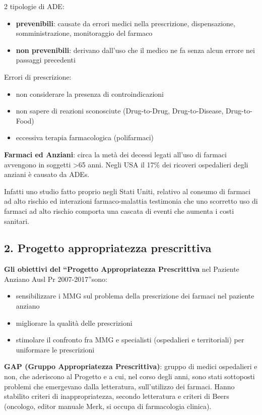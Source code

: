   2 tipologie di ADE:

\begin{itemize}
\item
  \textbf{prevenibili}: causate da errori medici nella prescrizione,
  dispensazione, somministrazione, monitoraggio del farmaco
\item
  \textbf{non prevenibili}: derivano dall'uso che il medico ne fa senza
  alcun errore nei passaggi precedenti
\end{itemize}

  Errori di prescrizione:
  
\begin{itemize}
\item non considerare la presenza di controindicazioni
\item non sapere di reazioni sconosciute (Drug-to-Drug, Drug-to-Disease,
  Drug-to-Food)
\item eccessiva terapia farmacologica (polifarmaci)
\end{itemize}

  \textbf{Farmaci ed Anziani}: circa la metà dei decessi legati all'uso
  di farmaci avvengono in soggetti \textgreater{}65 anni. Negli USA il
  17\% dei ricoveri ospedalieri degli anziani è causato da ADEs.

  Infatti uno studio fatto proprio negli Stati Uniti, relativo al
  consumo di farmaci ad alto rischio ed interazioni farmaco-malattia
  testimonia che uno scorretto uso di farmaci ad alto rischio comporta
  una cascata di eventi che aumenta i costi sanitari.

  \subsection{2. Progetto appropriatezza prescrittiva}
  
  \textbf{Gli obiettivi del ``Progetto Appropriatezza Prescrittiva} nel
  Paziente Anziano Ausl Pr 2007-2017''sono:

\begin{itemize}
\item
  sensibilizzare i MMG sul problema della prescrizione dei farmaci nel
  paziente anziano
\item
  migliorare la qualità delle prescrizioni
\item
  stimolare il confronto fra MMG e specialisti (ospedalieri e
  territoriali) per uniformare le prescrizioni
\end{itemize}

  \textbf{GAP (Gruppo Appropriatezza Prescrittiva)}: gruppo di medici
  ospedalieri e non, che aderiscono al Progetto e a cui, nel corso degli
  anni, sono stati sottoposti problemi che emergevano dalla letteratura,
  sull'utilizzo dei farmaci. Hanno stabilito criteri di
  inappropriatezza, secondo letteratura e criteri di Beers (oncologo,
  editor manuale Merk, si occupa di farmacologia clinica).

